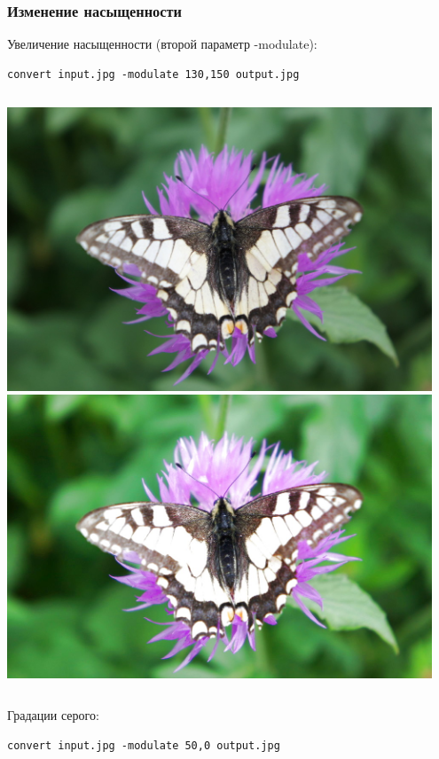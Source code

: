 \documentclass[11pt, compress]{beamer}
\renewcommand{\emph}[1]{\textcolor{dark-blue}{#1}}
\begin{document}
\begin{frame}[c, fragile]
\frametitle{Изменение насыщенности}
Увеличение насыщенности (второй параметр \emph{-modulate}):
\begin{lstlisting}
convert input.jpg -modulate 130,150 output.jpg
\end{lstlisting}
\begin{columns}
\center
\includegraphics[width=0.95\textwidth]{FLY1000.jpg}
\center
\includegraphics[width=0.95\textwidth]{FLY_modulate_130_150.jpg}
\end{columns}
\vfill
Градации серого:
\begin{lstlisting}
convert input.jpg -modulate 50,0 output.jpg
\end{lstlisting}
\end{frame}
\end{document}
